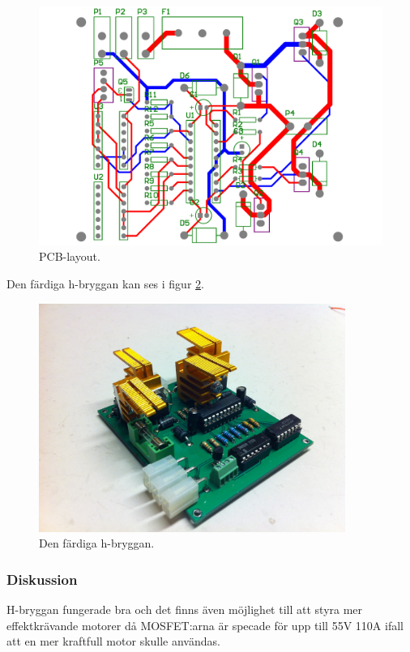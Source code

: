 \begin{figure}[htbp!]
\centering
\includegraphics[width=12cm]{../../includes/figures/H_brygga_pcb}
\caption{PCB-layout.}
\label{fig:pcb_layout}
\end{figure}

Den färdiga h-bryggan kan ses i figur \ref{fig:mounted_h_bridge}.

\begin{figure}[htbp!]
\centering
\includegraphics[width=10cm]{../../includes/figures/Hbridge}
\caption{Den färdiga h-bryggan.}
\label{fig:mounted_h_bridge}
\end{figure}

\subsubsection{Diskussion}
H-bryggan fungerade bra och det finns även möjlighet till att styra mer effektkrävande motorer då MOSFET:arna är specade för upp till 55V 110A ifall att en mer kraftfull motor skulle användas.

